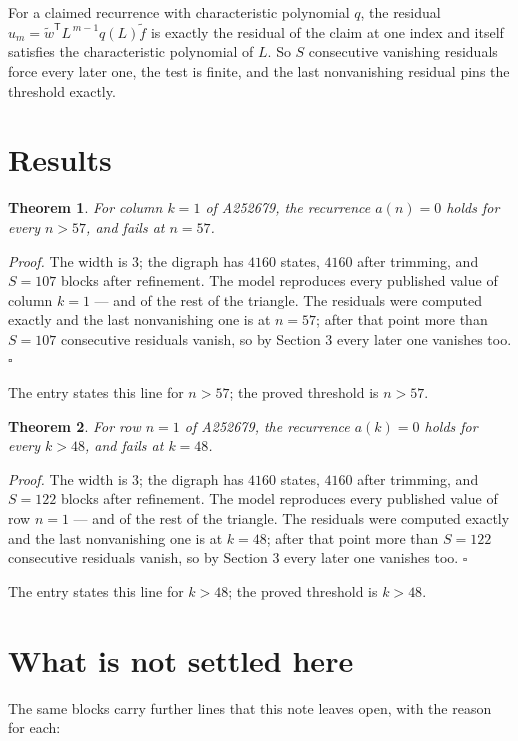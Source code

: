\documentclass[11pt]{article}
\newtheorem{theorem}{Theorem}
\theoremstyle{definition}
\begin{document}
For a claimed recurrence with characteristic polynomial $q$, the residual $u_m = \tilde w^{\mathsf T}L^{\,m-1}q(L)\tilde f$ is exactly the residual of the claim at one index and itself satisfies the characteristic polynomial of $L$. So $S$ consecutive vanishing residuals force every later one, the test is finite, and the last nonvanishing residual pins the threshold exactly.

\section{Results}

\begin{theorem} For column $k = 1$ of A252679, the recurrence $a(n) = 0$ holds for every $n > 57$, and fails at $n = 57$.\end{theorem}

{\itshape Proof.} The width is $3$; the digraph has $4160$ states, $4160$ after trimming, and $S = 107$ blocks after refinement. The model reproduces every published value of column $k = 1$ --- and of the rest of the triangle. The residuals were computed exactly and the last nonvanishing one is at $n = 57$; after that point more than $S = 107$ consecutive residuals vanish, so by Section 3 every later one vanishes too. $\square$

The entry states this line for $n > 57$; the proved threshold is $n > 57$.

\begin{theorem} For row $n = 1$ of A252679, the recurrence $a(k) = 0$ holds for every $k > 48$, and fails at $k = 48$.\end{theorem}

{\itshape Proof.} The width is $3$; the digraph has $4160$ states, $4160$ after trimming, and $S = 122$ blocks after refinement. The model reproduces every published value of row $n = 1$ --- and of the rest of the triangle. The residuals were computed exactly and the last nonvanishing one is at $k = 48$; after that point more than $S = 122$ consecutive residuals vanish, so by Section 3 every later one vanishes too. $\square$

The entry states this line for $k > 48$; the proved threshold is $k > 48$.

\section{What is not settled here}

The same blocks carry further lines that this note leaves open, with the reason for each:
\end{document}
